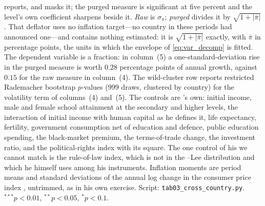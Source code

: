 \begin{table}[tp]
\begin{minipage}{0.90\linewidth}
reports, and masks it; the purged measure is significant at five percent and the level's own
coefficient sharpens beside it.
\emph{Raw} is $\sigma_\pi$; \emph{purged} divides it by $\sqrt{1+|\bar\pi|}$. That deflator uses no
inflation target---no country in these periods had announced one---and contains nothing estimated:
it is $\sqrt{1+|\bar\pi|}$ exactly, with $\bar\pi$ in percentage points, the units in which
the envelope of \eqref{eq:var_decomp} is fitted. The dependent variable is a fraction: in column~(5) a
one-standard-deviation rise in the purged measure is worth $0.28$ percentage points of
annual growth, against $0.15$ for the raw measure in column~(4). The wild-cluster row
reports restricted Rademacher bootstrap $p$-values ($999$ draws, clustered by country)
for the volatility term of columns~(4) and~(5).
The controls are \citeauthor{barro1995inflation}'s own: initial income, male and female school
attainment at the secondary and higher levels, the interaction of initial income with human
capital as he defines it, life expectancy, fertility, government consumption net of education and
defence, public education spending, the black-market premium, the terms-of-trade change, the
investment ratio, and the political-rights index with its square. The one control of his we cannot
match is the rule-of-law index, which is not in the \citeauthor{barro1995inflation}--Lee
distribution and which he himself uses among his instruments. Inflation moments are period means
and standard deviations of the annual log change in the consumer price index
\citep{muller2025global}, untrimmed, as in his own exercise. Script: \texttt{tab03\_cross\_country.py}.
$^{***}p<0.01$, $^{**}p<0.05$, $^{*}p<0.1$.
\end{minipage}
\end{table}
